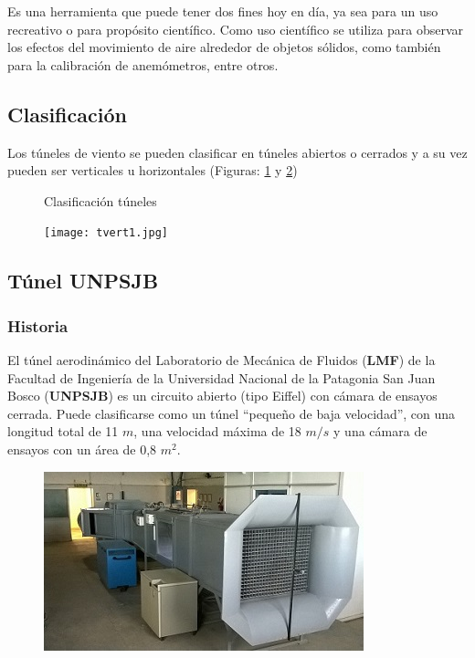 


\begin{tcolorbox}[colback=blue!5!white,colframe=blue!75!black,title=Túnel de viento]
Es una herramienta que puede tener dos fines hoy en día, ya sea para un uso recreativo o para propósito científico.
Como uso científico se utiliza para observar los efectos del movimiento de aire alrededor de objetos sólidos, como también para la calibración de anemómetros, entre otros.
\end{tcolorbox}


\subsection{Clasificación}
Los túneles de viento se pueden clasificar en túneles abiertos o cerrados y a su vez pueden ser verticales u horizontales (Figuras: \ref{fig:abierto} y \ref{fig:tunelRec})


\begin{figure}[htbp]
    \centering
    \caption{Clasificación túneles} \label{fig:abierto}
    \end{figure}

\begin{figure}[htb]
	\centering
	\texttt{[image: tvert1.jpg]}
	\label{fig:tunelRec}
\end{figure}

\subsection{Túnel UNPSJB}

\subsubsection{Historia}
\cite{tunelweb}	El túnel aerodinámico del Laboratorio de Mecánica de Fluidos (\textbf{LMF}) de la Facultad de Ingeniería de la Universidad Nacional de la Patagonia San Juan Bosco (\textbf{UNPSJB}) es un circuito abierto (tipo Eiffel) con cámara de ensayos cerrada. Puede clasificarse como un túnel “pequeño de baja velocidad”, con una longitud total de 11 $m$, una velocidad máxima de 18 $m/s$ y una cámara de ensayos con un área de 0,8 $m^2$.
	
	\begin{figure}[htb]
		\centering
		\includegraphics[scale=0.9]{tunel_unpsjb.JPG}
		\label{fig:tunelUni}
	\end{figure}
	
